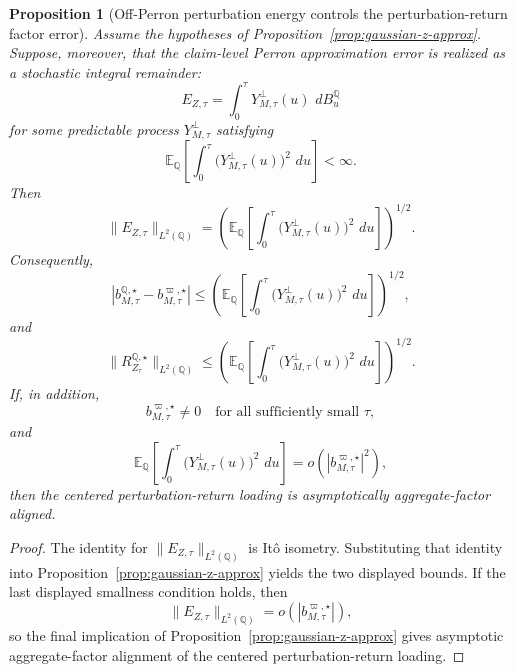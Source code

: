 \documentclass[11pt,a4paper]{amsart}
\theoremstyle{plain}
\newtheorem{proposition}[theorem]{Proposition}
\theoremstyle{definition}
\theoremstyle{remark}
\newcommand{\QQ}{\mathbb{Q}}
\newcommand{\EE}{\mathbb{E}}
\newcommand{\dd}{\,d}
\begin{document}
\begin{proposition}[Off-Perron perturbation energy controls the perturbation-return factor error]\label{prop:gaussian-z-energy}
Assume the hypotheses of Proposition~\ref{prop:gaussian-z-approx}.  Suppose, moreover, that the
claim-level Perron approximation error is realized as a stochastic integral remainder:
\[
        E_{Z,\tau}
        =
        \int_0^\tau Y_{M,\tau}^{\perp}(u)\,\dd B_u^\QQ
\]
for some predictable process \(Y_{M,\tau}^{\perp}\) satisfying
\[
        \EE_\QQ\!\left[\int_0^\tau \bigl(Y_{M,\tau}^{\perp}(u)\bigr)^2\,\dd u\right]<\infty.
\]
Then
\[
        \|E_{Z,\tau}\|_{L^2(\QQ)}
        =
        \left(
                \EE_\QQ\!\left[
                        \int_0^\tau \bigl(Y_{M,\tau}^{\perp}(u)\bigr)^2\,\dd u
                \right]
        \right)^{1/2}.
\]
Consequently,
\[
        \left|
                b_{M,\tau}^{\QQ,\star}
                -
                b_{M,\tau}^{\varpi,\star}
        \right|
        \le
        \left(
                \EE_\QQ\!\left[
                        \int_0^\tau \bigl(Y_{M,\tau}^{\perp}(u)\bigr)^2\,\dd u
                \right]
        \right)^{1/2},
\]
and
\[
        \|R_{Z_\tau}^{\QQ,\star}\|_{L^2(\QQ)}
        \le
        \left(
                \EE_\QQ\!\left[
                        \int_0^\tau \bigl(Y_{M,\tau}^{\perp}(u)\bigr)^2\,\dd u
                \right]
        \right)^{1/2}.
\]
If, in addition,
\[
        b_{M,\tau}^{\varpi,\star}\neq0
        \quad\text{for all sufficiently small }\tau,
\]
and
\[
        \EE_\QQ\!\left[\int_0^\tau \bigl(Y_{M,\tau}^{\perp}(u)\bigr)^2\,\dd u\right]
        =
        o\!\left(|b_{M,\tau}^{\varpi,\star}|^2\right),
\]
then the centered perturbation-return loading is asymptotically aggregate-factor aligned.
\end{proposition}

\begin{proof}
The identity for \(\|E_{Z,\tau}\|_{L^2(\QQ)}\) is It\^o isometry.  Substituting that identity into
Proposition~\ref{prop:gaussian-z-approx} yields the two displayed bounds.  If the last displayed
smallness condition holds, then
\[
        \|E_{Z,\tau}\|_{L^2(\QQ)}
        =
        o\!\left(|b_{M,\tau}^{\varpi,\star}|\right),
\]
so the final implication of Proposition~\ref{prop:gaussian-z-approx} gives asymptotic
aggregate-factor alignment of the centered perturbation-return loading.
\end{proof}
\end{document}
